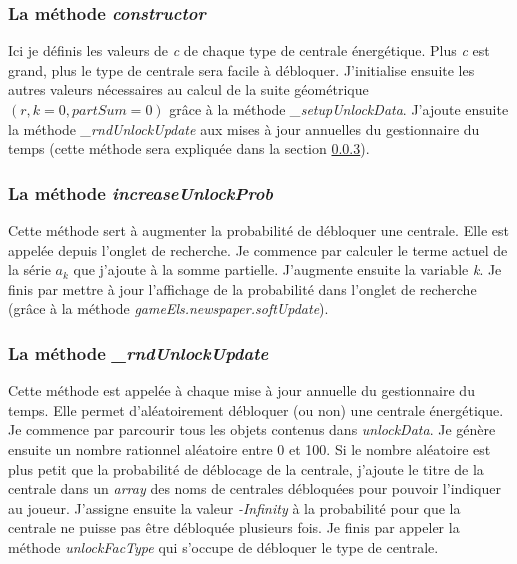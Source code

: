\documentclass{article}
\begin{document}
        
        \subsubsection{La méthode \textit{constructor}}
        Ici je définis les valeurs de \textit{c} de chaque type de centrale énergétique. Plus \textit{c} est grand, plus le type de centrale sera facile à débloquer. J'initialise ensuite les autres valeurs nécessaires au calcul de la suite géométrique $(r, k=0, partSum=0)$ grâce à la méthode \textit{\_setupUnlockData}. J'ajoute ensuite la méthode \textit{\_rndUnlockUpdate} aux mises à jour annuelles du gestionnaire du temps (cette méthode sera expliquée dans la section \ref{rndUnlockUpdate}).
        
        \subsubsection{La méthode \textit{increaseUnlockProb}}
        Cette méthode sert à augmenter la probabilité de débloquer une centrale. Elle est appelée depuis l'onglet de recherche.
        Je commence par calculer le terme actuel de la série $a_{k}$ que j'ajoute à la somme partielle. J'augmente ensuite la variable \textit{k}. Je finis par mettre à jour l'affichage de la probabilité dans l'onglet de recherche (grâce à la méthode \textit{gameEls.newspaper.softUpdate}).
        
        \subsubsection{La méthode \textit{\_rndUnlockUpdate}} \label{rndUnlockUpdate}
        Cette méthode est appelée à chaque mise à jour annuelle du gestionnaire du temps. Elle permet d'aléatoirement débloquer (ou non) une centrale énergétique. Je commence par parcourir tous les objets contenus dans \textit{unlockData}. Je génère ensuite un nombre rationnel aléatoire entre 0 et 100. Si le nombre aléatoire est plus petit que la probabilité de déblocage de la centrale, j'ajoute le titre de la centrale dans un \textit{array} des noms de centrales débloquées pour pouvoir l'indiquer au joueur. J'assigne ensuite la valeur \textit{-Infinity} à la probabilité pour que la centrale ne puisse pas être débloquée plusieurs fois. Je finis par appeler la méthode \textit{unlockFacType} qui s'occupe de débloquer le type de centrale.
        
\end{document}
